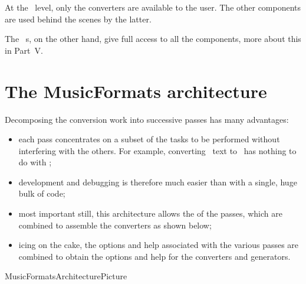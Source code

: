 At the \CLI\ level, only the converters are available to the user. The other components are used behind the scenes by the latter.

The \mf\ \API s, on the other hand, give full access to all the components, more about this in Part~V. %


\chapter{The MusicFormats architecture}\label{The MusicFormats architecture}

Decomposing the conversion work into successive passes has many advantages:
\begin{itemize}
\item each pass concentrates on a subset of the tasks to be performed without interfering with the others. For example, converting \mxml\ text to \msrRepr\ has nothing to do with \lily;

\item development and debugging is therefore much easier than with a single, huge bulk of code;

\item most important still, this architecture allows the  of the passes, which are combined to assemble the converters as shown below;

\item icing on the cake, the options and help associated with the various passes are combined to obtain the options and help for the converters and generators.
\end{itemize}


{MusicFormatsArchitecturePicture}

